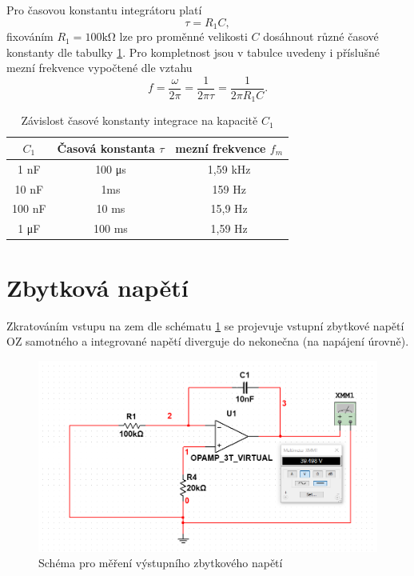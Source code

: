 \documentclass[twoside]{article}
\begin{document}
Pro časovou konstantu integrátoru platí
\begin{equation}
    \tau = R_1 C,
\end{equation}
fixováním $R_1 = 100 \si{\kilo\ohm}$ lze pro proměnné velikosti $C$ dosáhnout
různé časové konstanty dle tabulky \ref{tab:tau}. Pro kompletnost jsou v tabulce uvedeny i příslušné mezní frekvence
vypočtené dle vztahu
\begin{equation}
    f = \frac{\omega}{2 \pi} = \frac{1}{2 \pi \tau}= \frac{1}{2 \pi R_1 C}.
\end{equation}

\begin{table}[h!]
    \centering
    \begin{tabular}{c|c|c}
        $C_1$ & Časová konstanta $\tau$ &mezní frekvence $f_m$\\
        \hline
        1 \si{\nano\farad} & 100 \si{\micro\second} & 1,59 \si{\kilo\hertz}\\
        10 \si{\nano\farad} & 1\si{\milli\second} & 159 \si{\hertz}\\
        100 \si{\nano\farad} & 10 \si{\milli\second} & 15,9 \si{\hertz}\\
        1 \si{\micro\farad} & 100 \si{\milli\second} & 1,59 \si{\hertz}
    \end{tabular}
    \caption{Závislost časové konstanty integrace na kapacitě $C_1$}
    \label{tab:tau}
\end{table}

\section{Zbytková napětí}

Zkratováním vstupu na zem dle schématu \ref{fig:zbytkove_u} se projevuje vstupní zbytkové napětí OZ samotného a
integrované napětí diverguje do nekonečna (na napájení úrovně).

\begin{figure}[h!]
    \centering
    \includegraphics[width=0.65\linewidth]{zbytkove_u.png}
    \caption{Schéma pro měření výstupního zbytkového napětí}
    \label{fig:zbytkove_u}
\end{figure}
\end{document}
